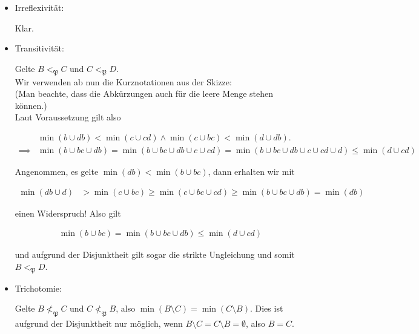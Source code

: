 \begin{solution}
\begin{enumerate}[label = \arabic*.]
\begin{center}
  \end{center}
  
  \begin{itemize}

    \item Irreflexivität:

    Klar.
    
    \item Transitivität:

    Gelte $B <_\mathfrak{P} C$ und $C <_\mathfrak{P} D$. \\
    Wir verwenden ab nun die Kurznotationen aus der Skizze: \\
    (Man beachte, dass die Abkürzungen auch für die leere Menge stehen können.) \\
    Laut Voraussetzung gilt also
    
    \begin{align*}
      &
      \min(b \cup db)
      <
      \min(c \cup cd)
      \land
      \min(c \cup bc)
      <
      \min(d \cup db). \\
      \implies &
      \min(b \cup bc \cup db)
      =
      \min(b \cup bc \cup db \cup c \cup cd)
      =
      \min(b \cup bc \cup db \cup c \cup cd \cup d)
      \leq
      \min(d \cup cd)
    \end{align*}
    
    Angenommen, es gelte $\min(db) < \min(b \cup bc)$, dann erhalten wir mit
    
    \begin{align*}
      \min(db \cup d) &> \min(c \cup bc) \geq \min(c \cup bc \cup cd) \geq \min(b \cup bc \cup db)
      =
      \min(db)
    \end{align*}
    
    einen Widerspruch!
    Also gilt
    
    \begin{align*}
      \min(b \cup bc)
      =
      \min(b \cup bc \cup db) \leq \min(d \cup cd)
    \end{align*}
    
    und aufgrund der Disjunktheit gilt sogar die strikte Ungleichung und somit $B <_\mathfrak{P} D$.
  
    \item Trichotomie:

    Gelte $B \nless_\mathfrak{P} C$ und $C \nless_\mathfrak{P} B$, also $\min(B \setminus C) = \min(C \setminus B)$.
    Dies ist aufgrund der Disjunktheit nur möglich, wenn $B \setminus C = C \setminus B = \emptyset$, also $B = C$.

  \end{itemize}

\end{enumerate}

\end{solution}

